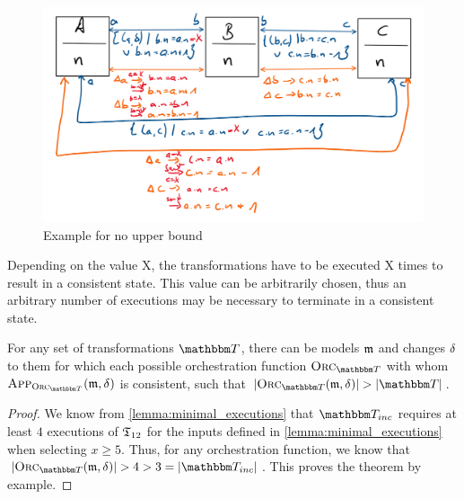 \begin{figure}
    \centering
    \includegraphics[width=\textwidth]{figures/correctness/orchestration/no_upper_bound_example_old.png}
    \caption{Example for no upper bound}
    \label{fig:formal:noupperboundexample}
\end{figure}

Depending on the value X, the transformations have to be executed X times to result in a consistent state. This value can be arbitrarily chosen, thus an arbitrary number of executions may be necessary to terminate in a consistent state.

\begin{theorem}
    \label{theorem:unbounded_execution}
    For any set of transformations $\transformationset{T}$, there can be models $\mathfrak{m}$ and changes $\mathfrak{\delta}_{}$ to them for which each possible orchestration function $\orcfunction{\transformationset{T}}$ with whom $\appfunction{\orcfunction{\transformationset{T}}}(\modeltuple{m}, \changetuple{})$ is consistent, such that $\abs{\orcfunction{\transformationset{T}}(\modeltuple{m}, \changetuple{})} > \abs{\transformationset{T}}$.
\end{theorem}
\begin{proof}
    We know from \autoref{lemma:minimal_executions} that $\transformationset{T}_{inc}$ requires at least $4$ executions of $\mathfrak{T}_{12}$ for the inputs defined in \autoref{lemma:minimal_executions} when selecting $x \geq 5$.
    Thus, for any orchestration function, we know that $\abs{\orcfunction{\transformationset{T}}(\modeltuple{m}, \changetuple{})} > 4 > 3 = \abs{\transformationset{T}_{inc}}$.
    This proves the theorem by example.
\end{proof}


